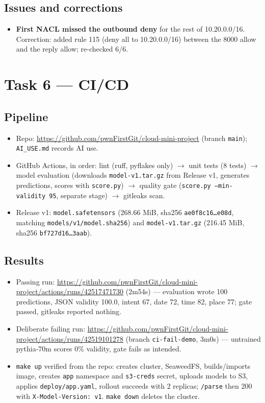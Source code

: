 \documentclass[11pt,a4paper]{article}
\begin{document}
\subsection*{Issues and corrections}
\begin{itemize}
\item \textbf{First NACL missed the outbound deny} for the rest of 10.20.0.0/16. Correction: added rule 115 (deny all to 10.20.0.0/16) between the 8000 allow and the reply allow; re-checked 6/6.
\end{itemize}

\section{Task 6 --- CI/CD}
\subsection*{Pipeline}
\begin{itemize}
\item Repo: \url{https://github.com/pwnFirstGit/cloud-mini-project} (branch \texttt{main}); \texttt{AI\_USE.md} records AI use.
\item GitHub Actions, in order: lint (ruff, pyflakes only) $\to$ unit tests (8 tests) $\to$ model evaluation (downloads \texttt{model-v1.tar.gz} from Release v1, generates predictions, scores with \texttt{score.py}) $\to$ quality gate (\texttt{score.py --min-validity 95}, separate stage) $\to$ gitleaks scan.
\item Release v1: \texttt{model.safetensors} (268.66 MiB, sha256 \texttt{ae0f8c16\ldots e08d}, matching \texttt{models/v1/model.sha256}) and \texttt{model-v1.tar.gz} (216.45 MiB, sha256 \texttt{bf727d16\ldots 3aab}).
\end{itemize}
\subsection*{Results}
\begin{itemize}
\item Passing run: \url{https://github.com/pwnFirstGit/cloud-mini-project/actions/runs/42517471730} (2m54s) --- evaluation wrote 100 predictions, JSON validity 100.0, intent 67, date 72, time 82, place 77; gate passed, gitleaks reported nothing.
\item Deliberate failing run: \url{https://github.com/pwnFirstGit/cloud-mini-project/actions/runs/42519101278} (branch \texttt{ci-fail-demo}, 3m0s) --- untrained pythia-70m scores 0\% validity, gate fails as intended.
\item \texttt{make up} verified from the repo: creates cluster, SeaweedFS, builds/imports image, creates \texttt{app} namespace and \texttt{s3-creds} secret, uploads models to S3, applies \texttt{deploy/app.yaml}, rollout succeeds with 2 replicas; \texttt{/parse} then 200 with \texttt{X-Model-Version: v1}. \texttt{make down} deletes the cluster.
\end{itemize}
\end{document}
